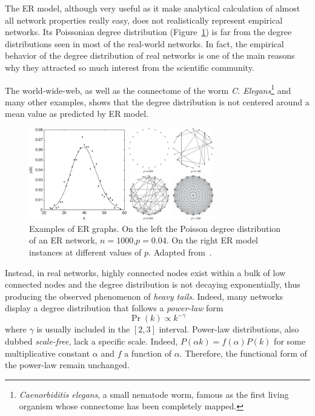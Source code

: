 The ER model, although very useful as it make analytical calculation of almost all network properties really easy, does not realistically represent empirical networks.
Its Poissonian degree distribution (Figure~\ref{fig:deg_dist_poisson_er}) is far from the degree distributions seen in most of the real-world networks.
In fact, the empirical behavior of the degree distribution of real networks is one of the main reasons why they attracted so much interest from the scientific community.

The world-wide-web, as well as the connectome of the worm \emph{C. Elegans}\footnote{\emph{Caenorbiditis elegans}, a small nematode worm, famous as the first living organism whose connectome has been completely mapped.} and many other examples, shows that the degree distribution is not centered around a mean value as predicted by ER model. 

\begin{figure}
\centering
\begin{minipage}[b]{0.5\textwidth}\centering
\includegraphics[height=4cm]{images/deg_dist_poisson_er.pdf}
\end{minipage}\noindent
\begin{minipage}[b]{0.5\textwidth}\centering
\includegraphics[height=4cm]{images/er_graphs.pdf}
\end{minipage}
\caption{Examples of ER graphs. On the left the Poisson degree distribution of an ER network, $n=1000$,$p=0.04$. On the right ER model instances at different values of $p$. Adapted from~\cite{estrada2011}.}
\label{fig:deg_dist_poisson_er}
\end{figure}

Instead, in real networks, highly connected nodes exist within a bulk of low connected nodes and the degree distribution is not decaying exponentially, thus producing the observed phenomenon of \emph{heavy tails}. Indeed, many networks display a degree distribution that follows a \emph{power-law} form
\begin{equation}
\Pr(k) \propto k^{-\gamma}
\end{equation}
where $\gamma$ is usually included in the $[2,3]$ interval.
Power-law distributions, also dubbed \emph{scale-free}, lack a specific scale. Indeed, $P(\alpha k)=f(\alpha)P(k)$ for some multiplicative constant $\alpha$  and $f$ a function of $\alpha$. Therefore, the functional form of the power-law remain unchanged.

